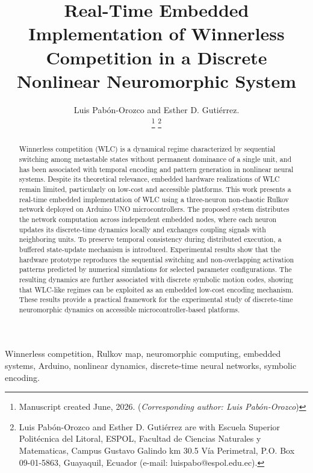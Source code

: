 \documentclass[lettersize,journal]{IEEEtran}
\begin{document}
    \title{Real-Time Embedded Implementation of Winnerless Competition in a Discrete Nonlinear Neuromorphic System}
    
  \author{Luis Pabón-Orozco and Esther D. Gutiérrez.

  \thanks{Manuscript created June, 2026. (\textit{Corresponding author: Luis Pabón-Orozco}) }
  \thanks{Luis Pabón-Orozco and Esther D. Gutiérrez are with Escuela Superior Politécnica del Litoral, ESPOL, Facultad de Ciencias Naturales y Matematicas, Campus Gustavo Galindo km 30.5 Vía Perimetral, P.O. Box 09-01-5863, Guayaquil, Ecuador (e-mail: luispabo@espol.edu.ec).}
  }  
\maketitle
\begin{abstract}
Winnerless competition (WLC) is a dynamical regime characterized by sequential switching among metastable states without permanent dominance of a single unit, and has been associated with temporal encoding and pattern generation in nonlinear neural systems. Despite its theoretical relevance, embedded hardware realizations of WLC remain limited, particularly on low-cost and accessible platforms. This work presents a real-time embedded implementation of WLC using a three-neuron non-chaotic Rulkov network deployed on Arduino UNO microcontrollers. The proposed system distributes the network computation across independent embedded nodes, where each neuron updates its discrete-time dynamics locally and exchanges coupling signals with neighboring units. To preserve temporal consistency during distributed execution, a buffered state-update mechanism is introduced. Experimental results show that the hardware prototype reproduces the sequential switching and non-overlapping activation patterns predicted by numerical simulations for selected parameter configurations. The resulting dynamics are further associated with discrete symbolic motion codes, showing that WLC-like regimes can be exploited as an embedded low-cost encoding mechanism. These results provide a practical framework for the experimental study of discrete-time neuromorphic dynamics on accessible microcontroller-based platforms.
\end{abstract}
\begin{IEEEkeywords}
Winnerless competition, Rulkov map, neuromorphic computing, embedded systems, Arduino, nonlinear dynamics, discrete-time neural networks, symbolic encoding.
\end{IEEEkeywords}
\end{document}
